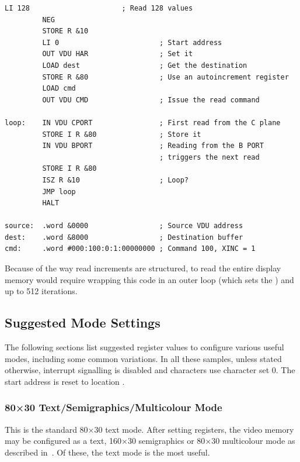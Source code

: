 \begin{lstlisting}[language=cftasm]
         LI 128                      ; Read 128 values
         NEG 
         STORE R &10
         LI 0                        ; Start address
         OUT VDU HAR                 ; Set it
         LOAD dest                   ; Get the destination
         STORE R &80                 ; Use an autoincrement register
         LOAD cmd
         OUT VDU CMD                 ; Issue the read command

loop:    IN VDU CPORT                ; First read from the C plane
         STORE I R &80               ; Store it
         IN VDU BPORT                ; Reading from the B PORT
                                     ; triggers the next read
         STORE I R &80
         ISZ R &10                   ; Loop?
         JMP loop
         HALT

source:  .word &0000                 ; Source VDU address
dest:    .word &8000                 ; Destination buffer
cmd:     .word #000:100:0:1:00000000 ; Command 100, XINC = 1
\end{lstlisting}

\noindent Because of the way read increments are structured, to read the entire
display memory would require wrapping this code in an outer loop (which sets
the ) and up to 512 iterations.


\subsection{Suggested Mode Settings}

The following sections list suggested register values to configure various
useful modes, including some common variations. In all these samples, unless
stated otherwise, interrupt signalling is disabled and characters use character
set 0. The start address is reset to location .

\subsubsection{80×30 Text/Semigraphics/Multicolour Mode}

This is the standard 80×30 text mode. After setting registers, the video memory
may be configured as a text, 160×30 semigraphics or 80×30 multicolour mode as
described in~. Of these, the text mode is the most useful.

